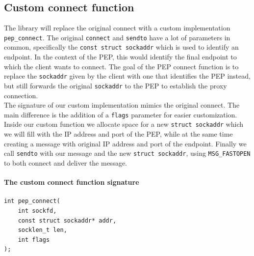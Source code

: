 \documentclass[a4paper,english, 11pt]{report}
\begin{document}
\subsection{Custom connect function}
The library will replace the original connect with a custom implementation \verb|pep_connect|. The original \verb|connect| and \verb|sendto| have a lot of parameters in common, specifically the \verb|const struct sockaddr| which is used to identify an endpoint. In the context of the PEP, this would identify the final endpoint to which the client wants to connect. The goal of the PEP connect function is to replace the \verb|sockaddr| given by the client with one that identifies the PEP instead, but still forwards the original \verb|sockaddr| to the PEP to establish the proxy connection.\\

The signature of our custom implementation mimics the original connect. The main difference is the addition of a \verb|flags| parameter for easier customization. Inside our custom function we allocate space for a new \verb|struct sockaddr| which we will fill with the IP address and port of the PEP, while at the same time creating a message with original IP address and port of the endpoint. Finally we call \verb|sendto| with our message and the new \verb|struct sockaddr|, using \verb|MSG_FASTOPEN| to both connect and deliver the message.\\

\noindent\begin{minipage}{\linewidth}
\paragraph{The custom connect function signature}
\begin{verbatim}
int pep_connect(
    int sockfd,
    const struct sockaddr* addr,
    socklen_t len,
    int flags
);
\end{verbatim}
\end{minipage}


%
%    
%
%    
%
\end{document}
